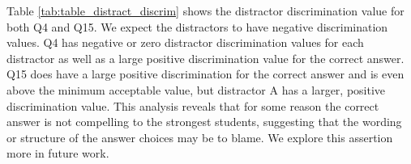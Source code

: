 

 
 Table \ref{tab:table_distract_discrim} shows the distractor discrimination value for both Q4 and Q15. We expect the distractors to have negative discrimination values. Q4 has negative or zero distractor discrimination values for each distractor as well as a large positive discrimination value for the correct answer. Q15 does have a large positive discrimination for the correct answer and is even above the minimum acceptable value, but distractor A has a larger, positive discrimination value. This analysis reveals that for some reason the correct answer is not compelling to the strongest students, suggesting that the wording or structure of the answer choices may be to blame. We explore this assertion more in future work.

